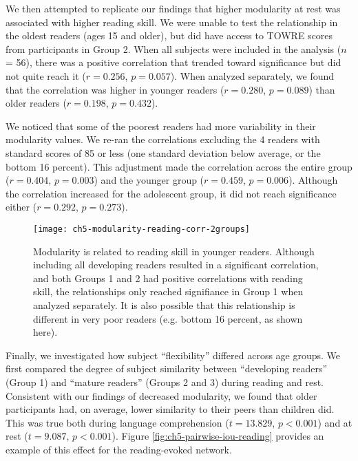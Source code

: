 We then attempted to replicate our findings that higher modularity at rest was associated with higher reading skill. We were unable to test the relationship in the oldest readers (ages 15 and older), but did have access to TOWRE scores from participants in Group 2. When all subjects were included in the analysis ($n$ = 56), there was a positive correlation that trended toward significance but did not quite reach it ($r = 0.256$, $p = 0.057$). When analyzed separately, we found that the correlation was higher in younger readers ($r=0.280$, $p=0.089$) than older readers ($r=0.198$, $p=0.432$). 

We noticed that some of the poorest readers had more variability in their modularity values. We re-ran the correlations excluding the 4 readers with standard scores of 85 or less (one standard deviation below average, or the bottom 16 percent). This adjustment made the correlation across the entire group ($r = 0.404$, $p = 0.003$) and the younger group ($r = 0.459$, $p = 0.006$). Although the correlation increased for the adolescent group, it did not reach significance either ($r = 0.292$, $p = 0.273$).

\begin{figure}[t]
	\centering
	\texttt{[image: ch5-modularity-reading-corr-2groups]}
    \caption[Modularity is related to reading skill in younger readers]{Modularity is related to reading skill in younger readers. Although including all developing readers resulted in a significant correlation, and both Groups 1 and 2 had positive correlations with reading skill, the relationships only reached signifiance in Group 1 when analyzed separately. It is also possible that this relationship is different in very poor readers (e.g. bottom 16 percent, as shown here).}
	\label{fig:ch5-modularity-reading-corr-2groups}
\end{figure}

Finally, we investigated how subject ``flexibility'' differed across age groups. We first compared the degree of subject similarity between ``developing readers'' (Group 1) and ``mature readers'' (Groups 2 and 3) during reading and rest. Consistent with our findings of decreased modularity, we found that older participants had, on average, lower similarity to their peers than children did. This was true both during language comprehension ($t = 13.829$, $p < 0.001$) and at rest ($t = 9.087$, $p < 0.001$). Figure \ref{fig:ch5-pairwise-iou-reading} provides an example of this effect for the reading-evoked network.

